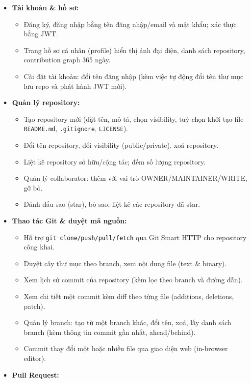 \begin{itemize}
\item \textbf{Tài khoản \& hồ sơ:}
  \begin{itemize}
  \item Đăng ký, đăng nhập bằng tên đăng nhập/email và mật khẩu; xác thực bằng JWT.
  \item Trang hồ sơ cá nhân (profile) hiển thị ảnh đại diện, danh sách repository, contribution graph 365 ngày.
  \item Cài đặt tài khoản: đổi tên đăng nhập (kèm việc tự động đổi tên thư mục lưu repo và phát hành JWT mới).
  \end{itemize}
\item \textbf{Quản lý repository:}
  \begin{itemize}
  \item Tạo repository mới (đặt tên, mô tả, chọn visibility, tuỳ chọn khởi tạo file \texttt{README.md}, \texttt{.gitignore}, \texttt{LICENSE}).
  \item Đổi tên repository, đổi visibility (public/private), xoá repository.
  \item Liệt kê repository sở hữu/cộng tác; đếm số lượng repository.
  \item Quản lý collaborator: thêm với vai trò OWNER/MAINTAINER/WRITE, gỡ bỏ.
  \item Đánh dấu sao (star), bỏ sao; liệt kê các repository đã star.
  \end{itemize}
\item \textbf{Thao tác Git \& duyệt mã nguồn:}
  \begin{itemize}
  \item Hỗ trợ \texttt{git clone/push/pull/fetch} qua Git Smart HTTP cho repository công khai.
  \item Duyệt cây thư mục theo branch, xem nội dung file (text \& binary).
  \item Xem lịch sử commit của repository (kèm lọc theo branch và đường dẫn).
  \item Xem chi tiết một commit kèm diff theo từng file (additions, deletions, patch).
  \item Quản lý branch: tạo từ một branch khác, đổi tên, xoá, lấy danh sách branch (kèm thông tin commit gần nhất, ahead/behind).
  \item Commit thay đổi một hoặc nhiều file qua giao diện web (in-browser editor).
  \end{itemize}
\item \textbf{Pull Request:}
  \begin{itemize}

\end{itemize}
\end{itemize}
